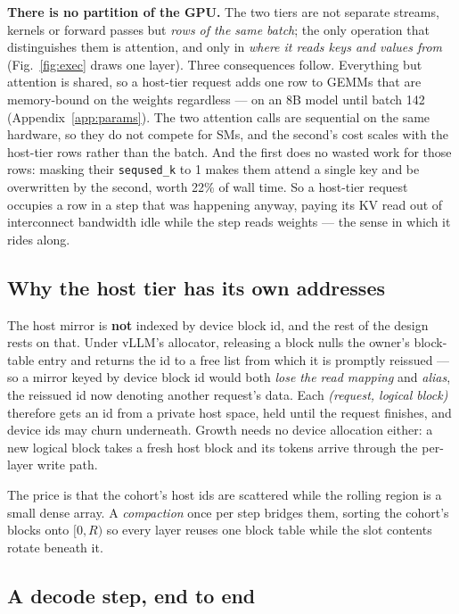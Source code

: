 \textbf{There is no partition of the GPU.} The two tiers are not separate streams,
kernels or forward passes but \emph{rows of the same batch}; the only operation that
distinguishes them is attention, and only in \emph{where it reads keys and values
from} (Fig.~\ref{fig:exec} draws one layer). Three consequences follow. Everything
but attention is shared, so a host-tier request adds one row to GEMMs that are
memory-bound on the weights regardless --- on an 8B model until batch 142
(Appendix~\ref{app:params}). The two attention calls are sequential on the same
hardware, so they do not compete for SMs, and the second's cost scales with the
host-tier rows rather than the batch. And the first does no wasted work for those
rows: masking their \texttt{seqused\_k} to 1 makes them attend a single key and be
overwritten by the second, worth 22\% of wall time. So a host-tier request occupies a
row in a step that was happening anyway, paying its KV read out of interconnect
bandwidth idle while the step reads weights --- the sense in which it rides along.

\subsection{Why the host tier has its own addresses}
\label{sec:design:spaces}

The host mirror is \textbf{not} indexed by device block id, and the rest of the
design rests on that. Under vLLM's allocator, releasing a block nulls the owner's
block-table entry and returns the id to a free list from which it is promptly
reissued --- so a mirror keyed by device block id would both \emph{lose the read
mapping} and \emph{alias}, the reissued id now denoting another request's data. Each
\emph{(request, logical block)} therefore gets an id from a private host space, held
until the request finishes, and device ids may churn underneath. Growth needs no
device allocation either: a new logical block takes a fresh host block and its
tokens arrive through the per-layer write path.

The price is that the cohort's host ids are scattered while the rolling region is a
small dense array. A \emph{compaction} once per step bridges them, sorting the
cohort's blocks onto $[0,R)$ so every layer reuses one block table while the slot
contents rotate beneath it.

\subsection{A decode step, end to end}
\label{sec:design:step}

